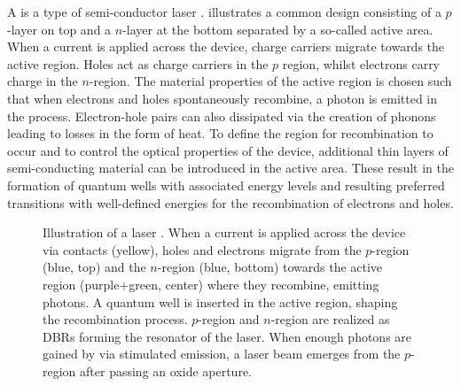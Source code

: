 		A \vcsel is a type of semi-conductor laser \cite{melngailis1965longitudinal, ibaraki1984pulsed}.  illustrates a common design consisting of a $p$-layer on top and a $n$-layer at the bottom separated by a so-called active area. When a current is applied across the device, charge carriers migrate towards the active region. Holes act as charge carriers in the $p$ region, whilst electrons carry charge in the $n$-region. The material properties of the active region is chosen such that when electrons and holes spontaneously recombine, a photon is emitted in the process. Electron-hole pairs can also dissipated via the creation of phonons leading to losses in the form of heat. To define the region for recombination to occur and to control the optical properties of the device, additional thin layers of semi-conducting material can be introduced in the active area. These result in the formation of quantum wells with associated energy levels and resulting preferred transitions with well-defined energies for the recombination of electrons and holes.

		\begin{figure}[!htb]
			\centering
			\caption[Sketch of a \vcsel]{Illustration of a \VCSEL laser \cite{Weidenfeld}. When a current is applied across the device via contacts (yellow), holes and electrons migrate from the $p$-region (blue, top) and the $n$-region (blue, bottom) towards the active region (purple+green, center) where they recombine, emitting photons. A quantum well is inserted in the active region, shaping the recombination process. $p$-region and $n$-region are realized as DBRs forming the resonator of the laser. When enough photons are gained by via stimulated emission, a laser beam emerges from the $p$-region after passing an oxide aperture.}
			\label{fig::vcsel_sketch}
		\end{figure}

